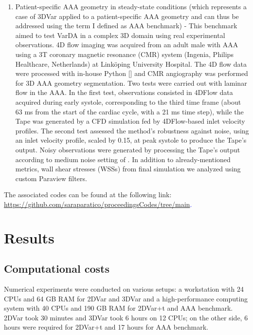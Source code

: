 \begin{enumerate}
    \item Patient-specific AAA geometry in steady-state conditions (which represents a case of 3DVar applied to a patient-specific AAA geometry and can thus be addressed using the term I defined as AAA benchmark) - This benchmark aimed to test VarDA in a complex 3D domain using real experimental observations. 4D flow imaging was acquired from an adult male with AAA using a 3T coronary magnetic resonance (CMR) system (Ingenia, Philips Healthcare, Netherlands) at Linköping University Hospital. The 4D flow data were processed with in-house Python [\cite{Saitta2024}] and CMR angiography was performed for 3D AAA geometry segmentation.
Two tests were carried out with laminar flow in the AAA. In the first test, observations consisted in 4DFlow data acquired during early systole, corresponding to the third time frame (about 63 ms from the start of the cardiac cycle, with a 21 ms time step), while the Tape was generated by a CFD simulation fed by 4DFlow-based inlet velocity profiles. The second test assessed the method's robustness against noise, using an inlet velocity profile, scaled by 0.15, at peak systole to produce the Tape's output. Noisy observations were generated by processing the Tape's output according to medium noise setting of \cite{Saitta2024}.
In addition to already-mentioned metrics, wall shear stresses (WSSs) from final simulation we analyzed using custom Paraview filters.
\end{enumerate}

The associated codes can be found at the following link:
\textcolor{blue}{\url{https://github.com/saraparatico/proceedingsCodes/tree/main}.}

\section*{Results}
\label{sec:Results}
\label{ch:chapter_three}

\subsection*{Computational costs}
Numerical experiments were conducted on various setups: a workstation with 24 CPUs and 64 GB RAM for 2DVar and 3DVar and a high-performance computing system with 40 CPUs and 190 GB RAM for 2DVar+t and AAA benchmark. 2DVar took 30 minutes and 3DVar took 6 hours on 12 CPUs; on the other side, 6 hours were required for 2DVar+t and 17 hours for AAA benchmark.

